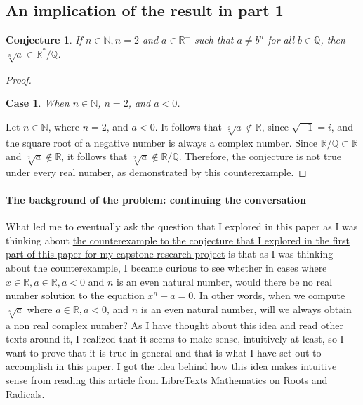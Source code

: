 \documentclass{turabian-researchpaper}
\newtheorem*{conjecture*}{Conjecture}
\newtheorem{case*}{Case}
\begin{document}
\subsection{An implication of the result in part 1}\hypertarget{counterexample from paper 1}{} 

\begin{conjecture*}
  If \(n \in \mathds{N}, n = 2\) and \(a \in \mathds{R}^{-}\) such that \(a \neq  b^n\) for all \(b \in \mathds{Q}\), then \(\sqrt[n]{a} \in \mathds{R}^{*}/\mathds{Q}\).  
\end{conjecture*}  

\begin{proof}
    \begin{case*}
       When \(n \in \mathds{N}\), \(n = 2\), and \(a < 0\). 
   \end{case*} 

Let \(n \in \mathds{N}\), where \(n = 2\), and \(a < 0\). It follows that \(\sqrt[2]{a} \notin \mathds{R}\), since \(\sqrt{-1} = i\), and the square root of a negative number is always a complex number. Since \(\mathds{R/Q} \subset \mathds{R}\) and \(\sqrt[2]{a} \notin \mathds{R}\), it follows that \(\sqrt[2]{a} \notin \mathds{R/Q}\). Therefore, the conjecture is not true under every real number, as demonstrated by this counterexample.

\end{proof} 

\paragraph{The background of the problem: continuing the conversation} 

What led me to eventually ask the question that I explored in this paper as I was thinking about \hyperlink{counterexample from paper 1}{the counterexample to the conjecture  that I explored in the first part of this paper for my capstone research project} is that as I was thinking about the counterexample, I became curious to see whether in cases where \(x \in \mathds{R}, a \in \mathds{R}, a < 0\) and \(n\) is an even natural number, would there be no real number solution to the equation \(x^n - a = 0\). In other words, when we compute \(\sqrt[n]{a}\) where \(a \in \mathds{R}, a < 0\), and \(n\) is an even natural number, will we always obtain a non real complex number? As I have thought about this idea and read other texts around it, I realized that it seems to make sense, intuitively at least, so I want to prove that it is true in general and that is what I have set out to accomplish in this paper. I got the idea behind how this idea makes intuitive sense from reading \href{https://math.libretexts.org/Bookshelves/Algebra/Advanced_Algebra/05%3A_Radical_Functions_and_Equations/5.01%3A_Roots_and_Radicals}{this article from LibreTexts Mathematics on Roots and Radicals}. 
\end{document}

